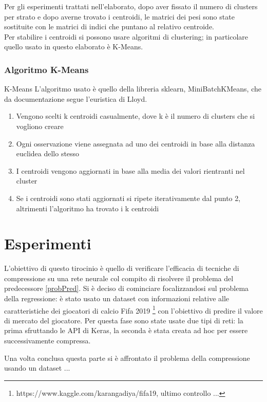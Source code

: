 \documentclass[12pt]{report}
\begin{document}
Per gli esperimenti trattati nell'elaborato, dopo aver fissato il numero di clusters per strato e dopo averne trovato i centroidi, le matrici dei pesi sono state sostituite con le matrici di indici che puntano al relativo centroide. \\
Per stabilire i centroidi si possono usare algoritmi di clustering; in particolare quello usato in questo elaborato è K-Means. 

\subsection{Algoritmo K-Means}
K-Means
L’algoritmo usato è quello della libreria sklearn, MiniBatchKMeans, che da documentazione segue l’euristica di Lloyd.

\begin{enumerate}
\item{Vengono scelti k centroidi casualmente, dove k è il numero di clusters che si vogliono creare}
\item{Ogni osservazione viene assegnata ad uno dei centroidi in base alla distanza euclidea dello stesso}
\item{I centroidi vengono aggiornati in base alla media dei valori rientranti nel cluster}
\item{Se i centroidi sono stati aggiornati si ripete iterativamente dal punto 2, altrimenti l’algoritmo ha trovato i k centroidi}
\end{enumerate}
 

\chapter{Esperimenti}

L'obiettivo di questo tirocinio è quello di verificare l'efficacia di tecniche di compressione su una rete neurale col compito di risolvere il problema del predecessore \ref{probPred}.
Si è deciso di cominciare focalizzandosi sul problema della regressione: è stato usato un dataset con informazioni relative alle caratteristiche dei giocatori di calcio Fifa 2019 \footnote{https://www.kaggle.com/karangadiya/fifa19, ultimo controllo ...} con l’obiettivo di predire il valore di mercato del giocatore. Per questa fase sono state usate due tipi di reti: la prima sfruttando le API di Keras, la seconda è stata creata ad hoc per essere successivamente compressa.

Una volta conclusa questa parte si è affrontato il problema della compressione usando un dataset ...
\end{document}
